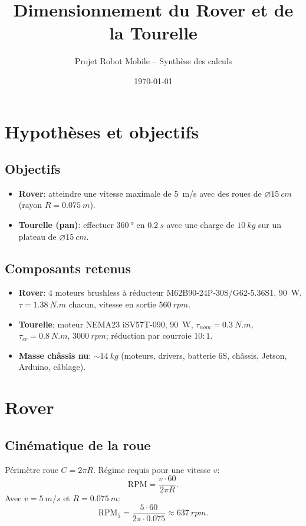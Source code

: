 \documentclass[11pt,a4paper]{article}
\title{Dimensionnement du Rover et de la Tourelle}
\author{Projet Robot Mobile -- Synthèse des calculs}
\date{\today}
\begin{document}
\maketitle
\tableofcontents
\bigskip

\section{Hypothèses et objectifs}
\subsection{Objectifs}
\begin{itemize}
  \item \textbf{Rover}: atteindre une vitesse maximale de \SI{5}{m/s} avec des roues de \(\varnothing \SI{15}{cm}\) (rayon \(R=\SI{0.075}{m}\)).
  \item \textbf{Tourelle (pan)}: effectuer \(\SI{360}{\degree}\) en \(\SI{0.2}{s}\) avec une charge de \(\SI{10}{kg}\) sur un plateau de \(\varnothing \SI{15}{cm}\).
\end{itemize}

\subsection{Composants retenus}
\begin{itemize}
  \item \textbf{Rover}: 4 moteurs brushless à réducteur M62B90-24P-30S/G62-5.36S1, \SI{90}{W}, \(\tau=\SI{1.38}{N.m}\) chacun, vitesse en sortie \(\SI{560}{rpm}\).
  \item \textbf{Tourelle}: moteur NEMA23 iSV57T-090, \SI{90}{W}, \(\tau_{nom}=\SI{0.3}{N.m}\), \(\tau_{cr}=\SI{0.8}{N.m}\), \(\SI{3000}{rpm}\); réduction par courroie \(10{:}1\).
  \item \textbf{Masse châssis nu}: \(\sim\SI{14}{kg}\) (moteurs, drivers, batterie 6S, châssis, Jetson, Arduino, câblage).
\end{itemize}

\section{Rover}
\subsection{Cinématique de la roue}
Périmètre roue \(C = 2\pi R\). Régime requis pour une vitesse \(v\):
\begin{equation}
\mathrm{RPM}=\frac{v\cdot 60}{2\pi R}.
\end{equation}
Avec \(v=\SI{5}{m/s}\) et \(R=\SI{0.075}{m}\):
\begin{equation}
\mathrm{RPM}_5=\frac{5\cdot 60}{2\pi\cdot 0.075}\approx \boxed{\SI{637}{rpm}}.
\end{equation}
\end{document}

